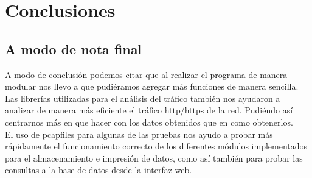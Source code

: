 \section{Conclusiones}

\subsection{A modo de nota final}

A modo de conclusión podemos citar que al realizar el programa de manera 
modular nos llevo a que pudiéramos agregar más funciones de manera sencilla. 
\\Las librerías utilizadas para el análisis del tráfico también nos ayudaron 
a analizar de manera más eficiente el tráfico http/https de la red. Pudiéndo 
así centrarnos más en que hacer con los datos obtenidos que en como obtenerlos.
\\El uso de pcapfiles para algunas de las pruebas nos ayudo a probar más rápidamente 
el funcionamiento correcto de los diferentes módulos implementados para el almacenamiento
e impresión de datos, como así también para probar las consultas a la base de datos 
desde la interfaz web.
